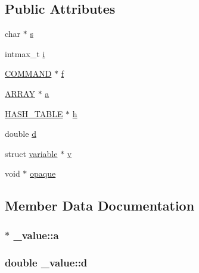 \subsection*{Public Attributes}
\begin{DoxyCompactItemize}
\item 
char $\ast$ \hyperlink{union__value_addb4ab2ffbf877c71d8a8c7cb52e6dd4}{s}
\item 
intmax\+\_\+t \hyperlink{union__value_a6263602a37e5879385c667354e1d5820}{i}
\item 
\hyperlink{command_8h_a8c41dec142c299806885773c902c0d87}{C\+O\+M\+M\+A\+ND} $\ast$ \hyperlink{union__value_a032a9c4929695b8c71b036fa9bdc75d2}{f}
\item 
\hyperlink{array_8h_a9c07c3330f66f4018e49ee90e58f0f39}{A\+R\+R\+AY} $\ast$ \hyperlink{union__value_ae67cd4568713fde20e66f04a9eccbe19}{a}
\item 
\hyperlink{hashlib_8h_a8284f9978df160609365484b829527e6}{H\+A\+S\+H\+\_\+\+T\+A\+B\+LE} $\ast$ \hyperlink{union__value_a0ea42897a8199c364092a3d9d72e6252}{h}
\item 
double \hyperlink{union__value_a44934e9648136b3cdc30d12b8b375810}{d}
\item 
struct \hyperlink{structvariable}{variable} $\ast$ \hyperlink{union__value_a81f5f742f41805c8591187b5b0acc0f2}{v}
\item 
void $\ast$ \hyperlink{union__value_a2344cac871c8663a6717092bff1d5950}{opaque}
\end{DoxyCompactItemize}


\subsection{Member Data Documentation}
\subsubsection[{\texorpdfstring{a}{a}}]{$\ast$ \+\_\+value\+::a}\hypertarget{union__value_ae67cd4568713fde20e66f04a9eccbe19}{}\label{union__value_ae67cd4568713fde20e66f04a9eccbe19}
\subsubsection[{\texorpdfstring{d}{d}}]{\setlength{\rightskip}{0pt plus 5cm}double \+\_\+value\+::d}\hypertarget{union__value_a44934e9648136b3cdc30d12b8b375810}{}\label{union__value_a44934e9648136b3cdc30d12b8b375810}
